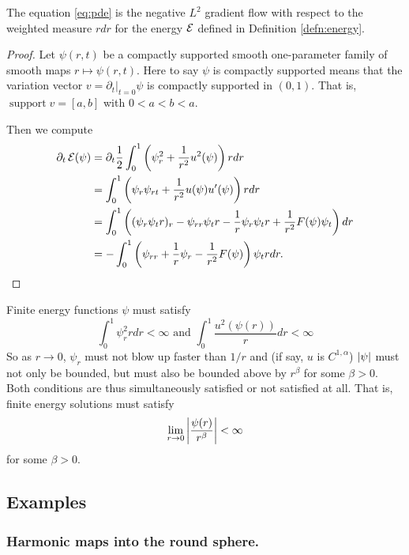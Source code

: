 \documentclass{amsart}
\begin{document}
\begin{lemma}
The equation \eqref{eq:pde} is the negative \(L^2\) gradient flow with respect to the weighted measure \(r dr\) for the energy \(\operatorname{\mathcal{E}}\) defined in Definition \ref{defn:energy}.
\end{lemma}

\begin{proof}
Let \(\psi(r, t)\) be a compactly supported smooth one-parameter family of smooth maps \(r \mapsto \psi(r, t)\). Here to say \(\psi\) is compactly supported means that the variation vector \(v = \partial_t|_{t=0} \psi\) is compactly supported in \((0, 1)\). That is, \(\operatorname{support} v = [a, b]\) with \(0 < a < b < a\).

Then we compute
\[
\begin{split}
\partial_t \operatorname{\mathcal{E}}(\psi) &= \partial_t \frac{1}{2} \int_0^1  \left(\psi_r^2 + \frac{1}{r^2} u^2(\psi)\right) r dr \\
&= \int_0^1  \left(\psi_r \psi_{rt} + \frac{1}{r^2} u(\psi)u'(\psi)\right) r dr \\
&= \int_0^1 \left((\psi_r \psi_t r)_r - \psi_{rr} \psi_t r - \frac{1}{r} \psi_r \psi_t r + \frac{1}{r^2} F(\psi) \psi_t\right) dr \\
&= - \int_0^1 \left(\psi_{rr} + \frac{1}{r} \psi_r - \frac{1}{r^2} F(\psi)\right) \psi_t r dr.
\end{split}
\]
\end{proof}

\begin{rem}
\label{rem:finite_energy}

Finite energy functions \(\psi\) must satisfy
\[
\int_0^1 \psi_r^2 r dr < \infty \text{ and } \int_0^1 \frac{u^2(\psi(r))}{r} dr < \infty
\]
So as \(r\to 0\), \(\psi_r\) must not blow up faster than \(1/r\) and (if say, \(u\) is \(C^{1,\alpha}\)) \(\left|{\psi}\right|\) must not only be bounded, but must also be bounded above by \(r^{\beta}\) for some \(\beta > 0\). Both conditions are thus simultaneously satisfied or not satisfied at all. That is, finite energy solutions must satisfy
\[
\lim_{r \to 0} \left|{\frac{\psi(r)}{r^{\beta}}}\right| < \infty
\]
for some \(\beta > 0\).
\end{rem}

\subsection{Examples}

\subsubsection*{Harmonic maps into the round sphere.}
\end{document}
